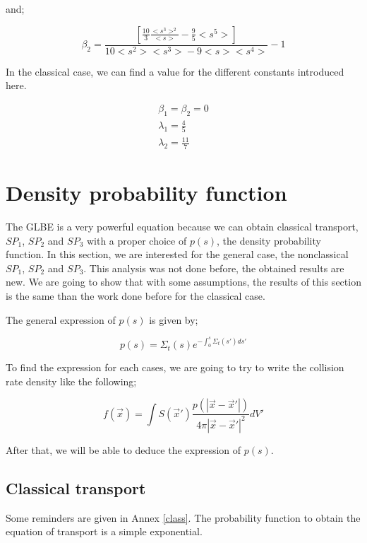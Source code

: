 \documentclass[a4paper, 12pt]{report}
\newcommand{\bl}{\big<}
\newcommand{\bg}{\big>}
\begin{document}
and;

\begin{equation}
\beta_2 = \frac{\left[  \frac{10}{3}\frac{\bl s^3\bg^2}{\bl s\bg}-\frac{9}{5}\bl s^5\bg \right]}{10\bl s^2\bg\bl s^3\bg-9\bl s\bg\bl s^4\bg}-1
\end{equation}

In the classical case, we can find a value for the different constants introduced here.

\begin{align}
\beta_1 = \beta_2 = 0\\
\lambda_1 = \frac{4}{5}\\
\lambda_2 = \frac{11}{7}
\end{align}

\section{Density probability function}

The GLBE is a very powerful equation because we can obtain classical transport, $SP_1$, $SP_2$ and $SP_3$ with a proper choice of $p(s)$, the density probability function. In this section, we are interested for the general case, the nonclassical $SP_1$, $SP_2$ and $SP_3$. This analysis was not done before, the obtained results are new. We are going to show that with some assumptions, the results of this section is the same than the work done before for the classical case.

The general expression of $p(s)$ is given by;

\begin{equation}
p(s) = \Sigma_t(s) e^{-\int_0^s \Sigma_t(s')ds'} 
\end{equation}

To find the expression for each cases, we are going to try to write the collision rate density like the following;

\begin{equation}\label{123}
f(\vec{x}) = \int S(\vec{x}') \frac{p(|\vec{x}-\vec{x}'|)}{4\pi|\vec{x}-\vec{x}'|^2}dV'
\end{equation}

After that, we will be able to deduce the expression of $p(s)$.

\subsection{Classical transport}

Some reminders are given in Annex \ref{class}. The probability function to obtain the equation of transport is a simple exponential.
\end{document}
